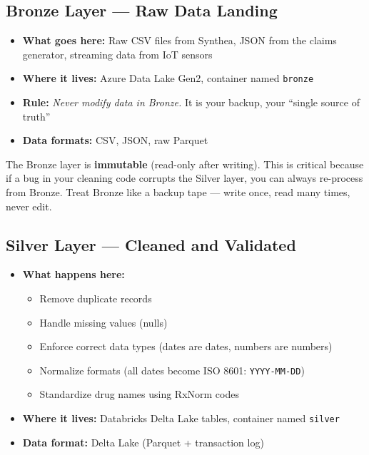 \documentclass[12pt, a4paper, oneside]{report}
\begin{document}
\subsection{Bronze Layer --- Raw Data Landing}

\begin{itemize}
    \item \textbf{What goes here:} Raw CSV files from Synthea, JSON from the claims generator, streaming data from IoT sensors
    \item \textbf{Where it lives:} Azure Data Lake Gen2, container named \texttt{bronze}
    \item \textbf{Rule:} \textit{Never modify data in Bronze.} It is your backup, your ``single source of truth''
    \item \textbf{Data formats:} CSV, JSON, raw Parquet
\end{itemize}

\begin{warningbox}
    The Bronze layer is \textbf{immutable} (read-only after writing). This is critical because if a bug in your cleaning code corrupts the Silver layer, you can always re-process from Bronze. Treat Bronze like a backup tape --- write once, read many times, never edit.
\end{warningbox}

\subsection{Silver Layer --- Cleaned and Validated}

\begin{itemize}
    \item \textbf{What happens here:}
    \begin{itemize}
        \item Remove duplicate records
        \item Handle missing values (nulls)
        \item Enforce correct data types (dates are dates, numbers are numbers)
        \item Normalize formats (all dates become ISO 8601: \texttt{YYYY-MM-DD})
        \item Standardize drug names using RxNorm codes
    \end{itemize}
    \item \textbf{Where it lives:} Databricks Delta Lake tables, container named \texttt{silver}
    \item \textbf{Data format:} Delta Lake (Parquet + transaction log)
\end{itemize}
\end{document}
